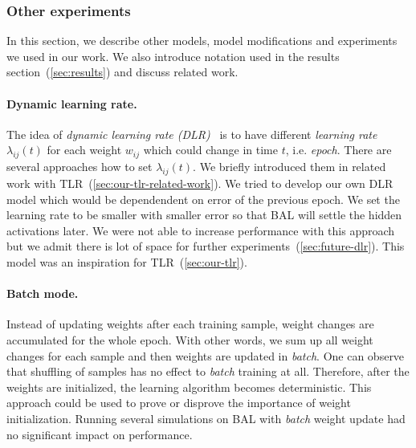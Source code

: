 \subsubsection{Other experiments}

In this section,  we describe other models, model modifications and experiments we used in our work. We also introduce notation used in the results section~(\ref{sec:results}) and discuss related work. 

\paragraph{Dynamic learning rate.} 
\label{sec:our-dynamic-lambda} 
The idea of \emph{dynamic learning rate (DLR)}~\citep{jacobs1988increased} is to have different \emph{learning rate} $\lambda_{ij}(t)$ for each weight $w_{ij}$ which could change in time $t$, i.e. \emph{epoch}. There are several approaches how to set $\lambda_{ij}(t)$. We briefly introduced them in related work with TLR~(\ref{sec:our-tlr-related-work}). We tried to develop our own DLR model which would be dependendent on error of the previous epoch. We set the learning rate to be smaller with smaller error so that BAL will settle the hidden activations later. We were not able to increase performance with this approach but we admit there is lot of space for further experiments~(\ref{sec:future-dlr}). This model was an inspiration for TLR~(\ref{sec:our-tlr}). 

\paragraph{Batch mode.} Instead of updating weights after each training sample, weight changes are accumulated for the whole epoch. With other words, we sum up all weight changes for each sample and then weights are updated in \emph{batch}. One can observe that shuffling of samples has no effect to \emph{batch} training at all. Therefore, after the weights are initialized, the learning algorithm becomes deterministic. This approach could be used to prove or disprove the importance of weight initialization. Running several simulations on BAL with \emph{batch} weight update had no significant impact on performance. 


